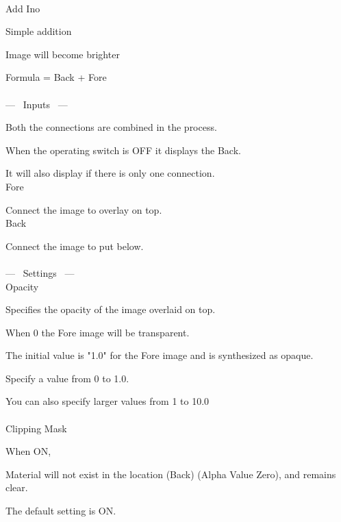 \documentclass[a4paper,12pt]{article}
\begin{document}
\thispagestyle{empty}

\Large
\noindent \\
Add Ino\medskip
\par
\normalsize
Simple addition\par
Image will become brighter\par
Formula = Back + Fore\\
\\
--- \ Inputs \ ---\par
Both the connections are combined in the process.\par
When the operating switch is OFF it displays the Back.\par
It will also display if there is only one connection.\\
Fore\par
Connect the image to overlay on top.\\
Back\par
Connect the image to put below.\\
\\
--- \ Settings \ ---\\
Opacity\par
Specifies the opacity of the image overlaid on top.\par
When 0 the Fore image will be transparent.\par
The initial value is "1.0" for the Fore image and is synthesized as opaque.\par
Specify a value from 0 to 1.0.\par
You can also specify larger values from 1 to 10.0\\
\\
Clipping Mask\par
When ON,\par
Material will not exist in the location (Back) (Alpha Value Zero), and remains clear.\par
The default setting is ON.
\end{document}
